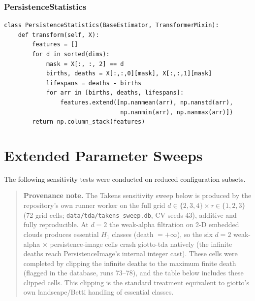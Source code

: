 \documentclass[12pt, a4paper]{report}
\theoremstyle{definition}
\theoremstyle{plain}
\theoremstyle{remark}
\begin{document}
\subsection*{PersistenceStatistics}

\begin{lstlisting}[style=python, caption={PersistenceStatistics transformer
(simplified excerpt: the executed \texttt{\_PersistenceStatistics} in
\texttt{factories.py} also pads variable-length diagram lists and
computes the four statistics per array \emph{row} via axis-wise
\texttt{nan}-functions, yielding one feature row per diagram; the statistics
and dimensions are identical).}]
class PersistenceStatistics(BaseEstimator, TransformerMixin):
    def transform(self, X):
        features = []
        for d in sorted(dims):
            mask = X[:, :, 2] == d
            births, deaths = X[:,:,0][mask], X[:,:,1][mask]
            lifespans = deaths - births
            for arr in [births, deaths, lifespans]:
                features.extend([np.nanmean(arr), np.nanstd(arr),
                                 np.nanmin(arr), np.nanmax(arr)])
        return np.column_stack(features)
\end{lstlisting}

\newpage

\chapter{Extended Parameter Sweeps}
\label{app:sweeps}

The following sensitivity tests were conducted on reduced
configuration subsets.

\begin{quote}\small
\textbf{Provenance note.} The Takens sensitivity sweep below is
produced by the repository's own runner worker on the full grid
$d \in \{2,3,4\} \times \tau \in \{1,2,3\}$ (72 grid cells;
\texttt{data/tda/takens\_sweep.db}, CV seeds 43), additive and fully
reproducible. At $d{=}2$ the weak-alpha filtration on 2-D embedded
clouds produces essential $H_1$ classes (death $= +\infty$), so the
six $d{=}2$ weak-alpha $\times$ persistence-image cells crash
giotto-tda natively (the infinite deaths reach PersistenceImage's
internal integer cast). These cells were completed by clipping the
infinite deaths to the maximum finite death (flagged in the database,
runs 73--78), and the table below includes these clipped cells. This
clipping is the standard treatment equivalent to giotto's own
landscape/Betti handling of essential classes.
\end{quote}
\end{document}
